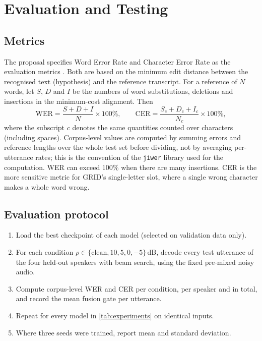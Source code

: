 \section{Evaluation and Testing}
\label{sec:evaluation}

\subsection{Metrics}
The proposal specifies Word Error Rate and Character Error Rate as the
evaluation metrics \spec. Both are based on the minimum edit distance between
the recognised text (hypothesis) and the reference transcript. For a reference of
$N$ words, let $S$, $D$ and $I$ be the numbers of word substitutions, deletions
and insertions in the minimum-cost alignment. Then
\begin{equation}
\mathrm{WER} = \frac{S + D + I}{N}\times 100\%,
\qquad
\mathrm{CER} = \frac{S_c + D_c + I_c}{N_c}\times 100\%,
\label{eq:wer}
\end{equation}
where the subscript $c$ denotes the same quantities counted over characters
(including spaces). Corpus-level values are computed by summing errors and
reference lengths over the whole test set before dividing, not by averaging
per-utterance rates; this is the convention of the \texttt{jiwer} library used
for the computation. WER can exceed 100\% when there are many insertions.
CER is the more sensitive metric for GRID's single-letter slot, where a single
wrong character makes a whole word wrong.

\subsection{Evaluation protocol}
\begin{enumerate}
  \item Load the best checkpoint of each model (selected on validation data
        only).
  \item For each condition $\rho \in \{\text{clean}, 10, 5, 0, -5\}$\,dB, decode
        every test utterance of the four held-out speakers with beam search,
        using the fixed pre-mixed noisy audio.
  \item Compute corpus-level WER and CER per condition, per speaker and in
        total, and record the mean fusion gate per utterance.
  \item Repeat for every model in \cref{tab:experiments} on identical inputs.
  \item Where three seeds were trained, report mean and standard deviation.
\end{enumerate}


